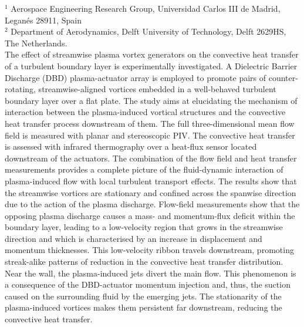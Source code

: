 %
%
%
%
%
%
%
\paperaffiliation
{%
  $^1$ Aerospace Engineering Research Group, Universidad Carlos III de Madrid, Legan\'{e}s 28911, Spain\\%
  $^2$ Department of Aerodynamics, Delft University of Technology, Delft 2629HS, The Netherlands. \\%
}%
%
%
%
%
%
%
%
%
%
%
\papersummary%
{%
The effect of streamwise plasma vortex generators on the convective heat transfer of a turbulent boundary layer is experimentally investigated. A Dielectric Barrier Discharge (DBD) plasma-actuator array is employed to promote pairs of counter-rotating, streamwise-aligned vortices embedded in a well-behaved turbulent boundary layer over a flat plate. The study aims at elucidating the mechanism of interaction between the plasma-induced vortical structures and the convective heat transfer process downstream of them. The full three-dimensional mean flow field is measured with planar and stereoscopic PIV. The convective heat transfer is assessed with infrared thermography over a heat-flux sensor located downstream of the actuators. The combination of the flow field and heat transfer measurements provides a complete picture of the fluid-dynamic interaction of plasma-induced flow with local turbulent transport effects. The results show that the streamwise vortices are stationary and confined across the spanwise direction due to the action of the plasma discharge. Flow-field measurements show that the opposing plasma discharge causes a mass- and momentum-flux deficit within the boundary layer, leading to a low-velocity region that grows in the streamwise direction and which is characterised by an increase in displacement and momentum thicknesses. This low-velocity ribbon travels downstream, promoting streak-alike patterns of reduction in the convective heat transfer distribution. Near the wall, the plasma-induced jets divert the main flow. This phenomenon is a consequence of the DBD-actuator momentum injection and, thus, the suction caused on the surrounding fluid by the emerging jets. The stationarity of the plasma-induced vortices makes them persistent far downstream, reducing the convective heat transfer.
}
